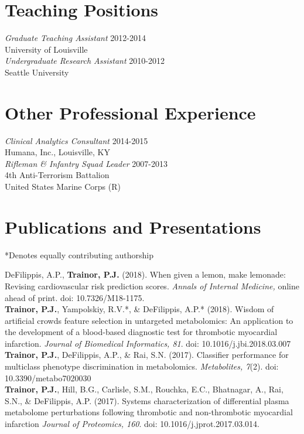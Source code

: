 {\section*{Teaching Positions}
\emph{Graduate Teaching Assistant} \hfill 2012-2014 \\
University of Louisville \\

\emph{Undergraduate Research Assistant} \hfill 2010-2012 \\
Seattle University

\section*{Other Professional Experience}
\emph{Clinical Analytics Consultant} \hfill 2014-2015 \\
Humana, Inc., Louisville, KY \\

\emph{Rifleman \& Infantry Squad Leader} \hfill 2007-2013 \\
4th Anti-Terrorism Battalion \\
United States Marine Corps (R) 

\section*{Publications and Presentations}
*Denotes equally contributing authorship 

DeFilippis, A.P., \textbf{Trainor, P.J.} (2018). When given a lemon, make lemonade: Revising cardiovascular risk prediction scores. \emph{Annals of Internal Medicine,} online ahead of print. doi: 10.7326/M18-1175. \\

\textbf{Trainor, P.J.}, Yampolskiy, R.V.*, \& DeFilippis, A.P.* (2018). Wisdom of artificial crowds feature selection in untargeted metabolomics: An application to the development of a blood-based diagnostic test for thrombotic myocardial infarction. \emph{Journal of Biomedical Informatics, 81}.  doi: 10.1016/j.jbi.2018.03.007  \\

\textbf{Trainor, P.J.}, DeFilippis, A.P., \& Rai, S.N. (2017). Classifier performance for multiclass phenotype discrimination in metabolomics. \emph{Metabolites, 7}(2). doi: 10.3390/metabo7020030 \\

\textbf{Trainor, P.J.}, Hill, B.G., Carlisle, S.M., Rouchka, E.C., Bhatnagar, A., Rai, S.N., \& DeFilippis, A.P. (2017). Systems characterization of differential plasma metabolome perturbations following thrombotic and non-thrombotic myocardial infarction \emph{Journal of Proteomics, 160}. doi: 10.1016/j.jprot.2017.03.014. \\

}
